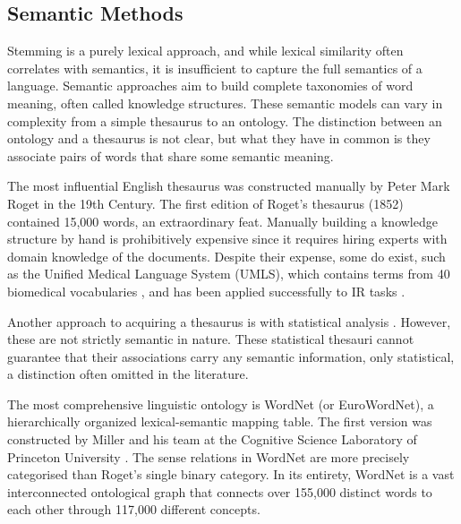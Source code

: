 \subsection{Semantic Methods}
Stemming is a purely lexical approach, and while lexical similarity often correlates with semantics, it is insufficient to capture the full semantics of a language. Semantic approaches aim to build complete taxonomies of word meaning, often called knowledge structures. These semantic models can vary in complexity from a simple thesaurus to an ontology. The distinction between an ontology and a thesaurus is not clear, but what they have in common is they associate pairs of words that share some semantic meaning. 

The most influential English thesaurus was constructed manually by Peter Mark Roget in the 19th Century. The first edition of Roget's thesaurus (1852) contained 15,000 words, an extraordinary feat. Manually building a knowledge structure by hand is prohibitively expensive since it requires hiring experts with domain knowledge of the documents. Despite their expense, some do exist, such as the Unified Medical Language System (UMLS), which contains terms from 40 biomedical vocabularies \cite{pmid27668467}, and has been applied successfully to IR tasks \cite{pmid9452981}.

Another approach to acquiring a thesaurus is with statistical analysis \cite{qiu1993concept}. However, these are not strictly semantic in nature. These statistical thesauri cannot guarantee that their associations carry any semantic information, only statistical, a distinction often omitted in the literature.

The most comprehensive linguistic ontology is WordNet (or EuroWordNet), a hierarchically organized lexical-semantic mapping table. The first version was constructed by Miller and his team at the Cognitive Science Laboratory of Princeton University \cite{Miller:1995:WLD:219717.219748}. The sense relations in WordNet are more precisely categorised than Roget's single binary category. In its entirety, WordNet is a vast interconnected ontological graph that connects over 155,000 distinct words to each other through 117,000 different concepts.


